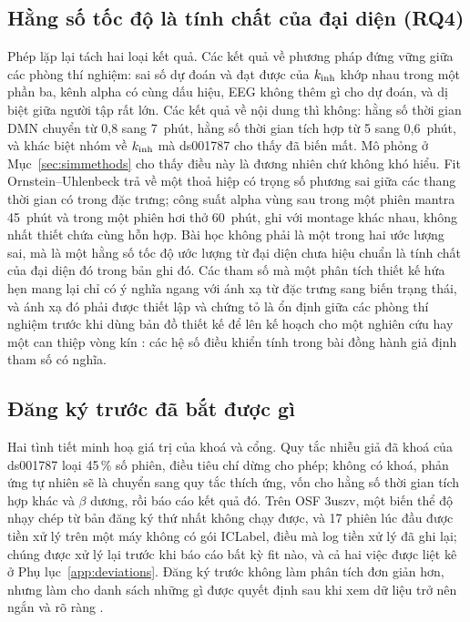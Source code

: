 \subsection{Hằng số tốc độ là tính chất của đại diện (RQ4)}
Phép lặp lại tách hai loại kết quả. Các kết quả về phương pháp đứng vững giữa các phòng thí nghiệm: sai số dự đoán và đạt được của $k_{\mathrm{inh}}$ khớp nhau trong một phần ba, kênh alpha có cùng dấu hiệu, EEG không thêm gì cho dự đoán, và dị biệt giữa người tập rất lớn. Các kết quả về nội dung thì không: hằng số thời gian DMN chuyển từ 0,8 sang 7~phút, hằng số thời gian tích hợp từ 5 sang 0,6~phút, và khác biệt nhóm về $k_{\mathrm{inh}}$ mà ds001787 cho thấy đã biến mất. Mô phỏng ở Mục~\ref{sec:simmethods} cho thấy điều này là đương nhiên chứ không khó hiểu. Fit Ornstein--Uhlenbeck trả về một thoả hiệp có trọng số phương sai giữa các thang thời gian có trong đặc trưng; công suất alpha vùng sau trong một phiên mantra 45~phút và trong một phiên hơi thở 60~phút, ghi với montage khác nhau, không nhất thiết chứa cùng hỗn hợp. Bài học không phải là một trong hai ước lượng sai, mà là một hằng số tốc độ ước lượng từ đại diện chưa hiệu chuẩn là tính chất của đại diện đó trong bản ghi đó. Các tham số mà một phân tích thiết kế hứa hẹn mang lại chỉ có ý nghĩa ngang với ánh xạ từ đặc trưng sang biến trạng thái, và ánh xạ đó phải được thiết lập và chứng tỏ là ổn định giữa các phòng thí nghiệm trước khi dùng bản đồ thiết kế để lên kế hoạch cho một nghiên cứu hay một can thiệp vòng kín \cite{Sitaram2017,Ros2020}: các hệ số điều khiển tính trong bài đồng hành giả định tham số có nghĩa.

\subsection{Đăng ký trước đã bắt được gì}
Hai tình tiết minh hoạ giá trị của khoá và cổng. Quy tắc nhiễu giả đã khoá của ds001787 loại 45\,\% số phiên, điều tiêu chí dừng cho phép; không có khoá, phản ứng tự nhiên sẽ là chuyển sang quy tắc thích ứng, vốn cho hằng số thời gian tích hợp khác và $\beta$ dương, rồi báo cáo kết quả đó. Trên OSF 3uszv, một biến thể độ nhạy chép từ bản đăng ký thứ nhất không chạy được, và 17 phiên lúc đầu được tiền xử lý trên một máy không có gói ICLabel, điều mà log tiền xử lý đã ghi lại; chúng được xử lý lại trước khi báo cáo bất kỳ fit nào, và cả hai việc được liệt kê ở Phụ lục~\ref{app:deviations}. Đăng ký trước không làm phân tích đơn giản hơn, nhưng làm cho danh sách những gì được quyết định sau khi xem dữ liệu trở nên ngắn và rõ ràng \cite{Nosek2018}.

